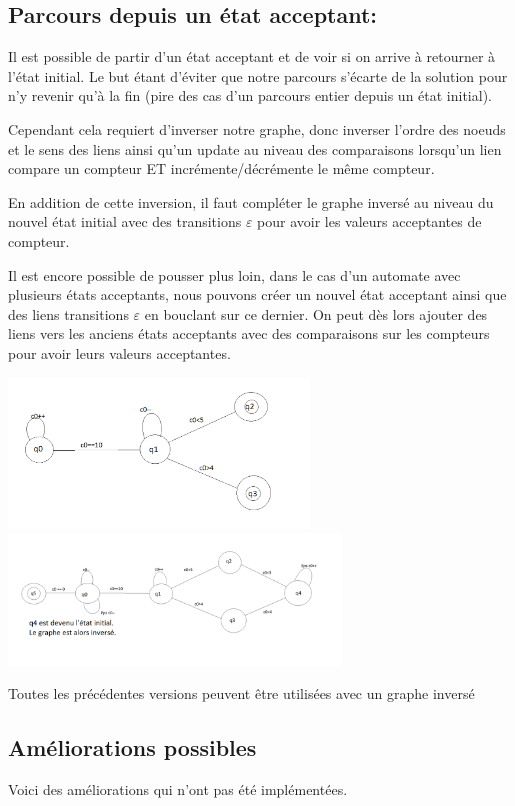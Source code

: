 \subsection{Parcours depuis un état acceptant:}
Il est possible de partir d'un état acceptant et de voir si on arrive à retourner à l'état initial. Le but étant d'éviter que notre parcours s'écarte de la solution pour n'y revenir qu'à la fin (pire des cas d'un parcours entier depuis un état initial).\par
Cependant cela requiert d'inverser notre graphe, donc inverser l'ordre des noeuds et le sens des liens ainsi qu'un update au niveau des comparaisons lorsqu'un lien compare un compteur ET incrémente/décrémente le même compteur.\par
En addition de cette inversion, il faut compléter le graphe inversé au niveau du nouvel état initial avec des transitions $\varepsilon$ pour avoir les valeurs acceptantes de compteur.\par
Il est encore possible de pousser plus loin, dans le cas d'un automate avec plusieurs états acceptants, nous pouvons créer un nouvel état acceptant ainsi que des liens transitions $\varepsilon$ en bouclant sur ce dernier. On peut dès lors ajouter des liens vers les anciens états acceptants avec des comparaisons sur les compteurs pour avoir leurs valeurs acceptantes.\par
\includegraphics[height=4cm]{a0.png}
\includegraphics[height=3.5cm]{a1.png}
\par
Toutes les précédentes versions peuvent être utilisées avec un graphe inversé\par



\subsection{Améliorations possibles}
Voici des améliorations qui n'ont pas été implémentées.

